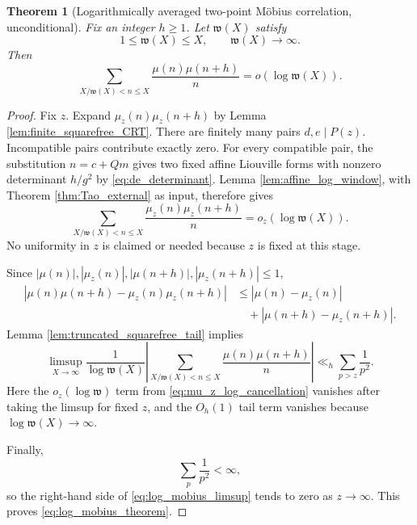 \documentclass[11pt]{amsart}
\numberwithin{equation}{section}
\theoremstyle{plain}
\newtheorem{theorem}{Theorem}[section]
\theoremstyle{definition}
\theoremstyle{remark}
\newcommand{\mob}{\mu}
\newcommand{\what}{\mathfrak w}
\begin{document}
\begin{theorem}[Logarithmically averaged two-point Möbius correlation, unconditional]
\label{thm:log_mobius}
Fix an integer $h\ge1$.  Let $\what(X)$ satisfy
\begin{equation}
1\le\what(X)\le X,
\qquad
\what(X)\longrightarrow\infty.
\label{eq:omega_conditions}
\end{equation}
Then
\begin{equation}
\boxed{
\sum_{X/\what(X)<n\le X}
\frac{\mob(n)\mob(n+h)}{n}
=o(\log\what(X)).}
\label{eq:log_mobius_theorem}
\end{equation}
\end{theorem}

\begin{proof}
Fix $z$.  Expand $\mob_z(n)\mob_z(n+h)$ by Lemma \ref{lem:finite_squarefree_CRT}.  There are finitely many pairs $d,e\mid P(z)$.  Incompatible pairs contribute exactly zero.  For every compatible pair, the substitution $n=c+Qm$ gives two fixed affine Liouville forms with nonzero determinant $h/g^2$ by \eqref{eq:de_determinant}.  Lemma \ref{lem:affine_log_window}, with Theorem \ref{thm:Tao_external} as input, therefore gives
\begin{equation}
\sum_{X/\what(X)<n\le X}
\frac{\mob_z(n)\mob_z(n+h)}{n}
=o_z(\log\what(X)).
\label{eq:mu_z_log_cancellation}
\end{equation}
No uniformity in $z$ is claimed or needed because $z$ is fixed at this stage.

Since $|\mob(n)|,|\mob_z(n)|,|\mob(n+h)|,|\mob_z(n+h)|\le1$,
\begin{align}
|\mob(n)\mob(n+h)-\mob_z(n)\mob_z(n+h)|
&\le |\mob(n)-\mob_z(n)|
\label{eq:product_difference_first}\\
&\quad+|\mob(n+h)-\mob_z(n+h)|.
\label{eq:product_difference_second}
\end{align}
Lemma \ref{lem:truncated_squarefree_tail} implies
\begin{equation}
\limsup_{X\to\infty}
\frac1{\log\what(X)}
\left|
\sum_{X/\what(X)<n\le X}
\frac{\mob(n)\mob(n+h)}n
\right|
\ll_h
\sum_{p>z}\frac1{p^2}.
\label{eq:log_mobius_limsup}
\end{equation}
Here the $o_z(\log\what)$ term from \eqref{eq:mu_z_log_cancellation} vanishes after taking the limsup for fixed $z$, and the $O_h(1)$ tail term vanishes because $\log\what(X)\to\infty$.

Finally,
\begin{equation}
\sum_p\frac1{p^2}<\infty,
\label{eq:prime_square_convergence}
\end{equation}
so the right-hand side of \eqref{eq:log_mobius_limsup} tends to zero as $z\to\infty$.  This proves \eqref{eq:log_mobius_theorem}.
\end{proof}
\end{document}
